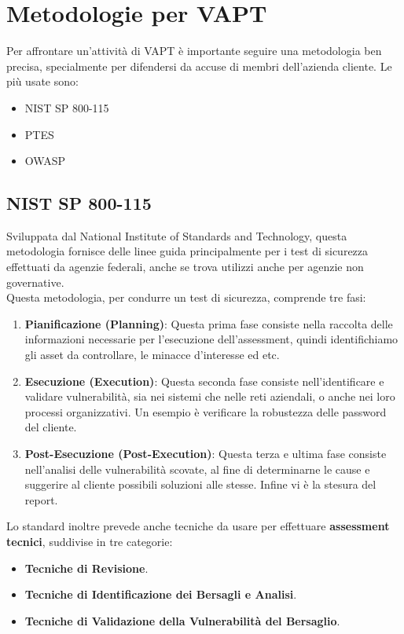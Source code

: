 \documentclass{article}
\begin{document}
\newpage

\section{Metodologie per VAPT}
Per affrontare un'attività di VAPT è importante seguire una metodologia ben precisa, specialmente per difendersi da accuse di membri dell'azienda cliente. Le più usate sono:
\begin{itemize}
    \item NIST SP 800-115
    \item PTES
    \item OWASP
\end{itemize}

\subsection{NIST SP 800-115}
Sviluppata dal National Institute of Standards and Technology, questa metodologia fornisce delle linee guida principalmente per i test di sicurezza effettuati da agenzie federali, anche se trova utilizzi anche per agenzie non governative.\\
Questa metodologia, per condurre un test di sicurezza, comprende tre fasi:
\begin{enumerate}
    \item \textbf{Pianificazione (Planning)}: Questa prima fase consiste nella raccolta delle informazioni necessarie per l'esecuzione dell'assessment, quindi identifichiamo gli asset da controllare, le minacce d'interesse ed etc.
    \item \textbf{Esecuzione (Execution)}: Questa seconda fase consiste nell'identificare e validare vulnerabilità, sia nei sistemi che nelle reti aziendali, o anche nei loro processi organizzativi. Un esempio è verificare la robustezza delle password del cliente.
    \item \textbf{Post-Esecuzione (Post-Execution)}: Questa terza e ultima fase consiste nell'analisi delle vulnerabilità scovate, al fine di determinarne le cause e suggerire al cliente possibili soluzioni alle stesse. Infine vi è la stesura del report.
\end{enumerate}

Lo standard inoltre prevede anche tecniche da usare per effettuare \textbf{assessment tecnici}, suddivise in tre categorie:
\begin{itemize}
    \item \textbf{Tecniche di Revisione}.
    \item \textbf{Tecniche di Identificazione dei Bersagli e Analisi}.
    \item \textbf{Tecniche di Validazione della Vulnerabilità del Bersaglio}.
\end{itemize}
\end{document}
